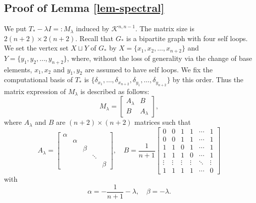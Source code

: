 \documentclass[a4paper,12pt]{article}
\numberwithin{equation}{section}
\begin{document}
\subsection{Proof of Lemma \ref{lem-spectral}}
We put $T_\ast-\lambda I=: M_\lambda$ induced by $\mathcal{K}^{n,n-1}$. The matrix size is $2(n+2)\times 2(n+2)$. 
Recall that $G_\ast$ is a bipartite graph with four self loops. 
We set the vertex set $X\sqcup Y$ of $G_\ast$ by $X=\{x_1,x_2,\dots,x_{n+2}\}$ and $Y=\{y_1,y_2,\dots,y_{n+2}\}$,
where, without the loss of generality via the change of base elements, $x_1, x_2$ and $y_1,y_2$ are assumed to have self loops. 
We fix the computational basis of $T_\ast$ is $\{\delta_{x_1},\dots, \delta_{x_{n+2}},\delta_{y_1},\dots, \delta_{y_{n+2}}\}$ by this order. 
Thus the matrix expression of $M_\lambda$ is described as follows: 
\begin{equation*}
M_\lambda = \begin{bmatrix} A_\lambda & B \\ B & A_\lambda \end{bmatrix},
\end{equation*}
where $A_\lambda$ and $B$ are $(n+2)\times (n+2)$ matrices such that 
\begin{equation*}
A_\lambda=\begin{bmatrix} 
        \alpha &        &       &        &        \\
               & \alpha &       &        &        \\
               &        & \beta &        &        \\
               &        &       & \ddots &        \\
               &        &       &        & \beta 
        \end{bmatrix}, \quad
B= \frac{1}{n+1}
\begin{bmatrix} 
        0 & 0 & 1 & 1 & \cdots & 1  \\ 
        0 & 0 & 1 & 1 & \cdots & 1  \\ 
        1 & 1 & 0 & 1 & \cdots & 1  \\ 
        1 & 1 & 1 & 0 & \cdots & 1  \\
        \vdots & \vdots & \vdots & \vdots & \ddots & \vdots  \\
        1 & 1 & 1 & 1 & \cdots  & 0 
\end{bmatrix} 
\end{equation*}
with 
\begin{equation*}
\alpha=-\frac{1}{n+1}-\lambda,\quad \beta=-\lambda.
\end{equation*}
\end{document}

